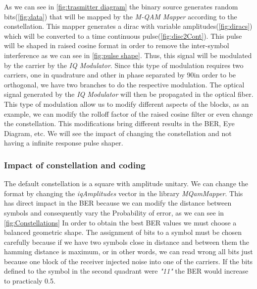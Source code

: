\begin{text}
As we can see in \ref{fig:trasmitter diagram} the binary source generates random bits(\ref{fig:data}) that will be mapped by the \textit{M-QAM Mapper} according to the constellation. This mapper generates a dirac with variable amplitudes(\ref{fig:diracs}) which will be converted to a time continuous pulse(\ref{fig:disc2Cont}).\newline
This pulse will be shaped in raised cosine format in order to remove the inter-symbol interference as we can see in \ref{fig:pulse shape}. Thus, this signal will be modulated by the carrier by the \textit{IQ Modulator}.\newline
Since this type of modulation requires two carriers, one in quadrature and other in phase separated by 90\textdegree  in order to be orthogonal, we have two branches to do the respective modulation.\newline
The optical signal generated by the \textit{IQ Modulator} will then be propagated in the optical fiber.
\bigbreak
This type of modulation allow us to modify different aspects of the blocks, as an example, we can modify the rolloff factor of the raised cosine filter or even change the constellation. This modifications bring different results in the BER, Eye Diagram, etc. We will see the impact of changing the constellation and not having a infinite response pulse shaper.%
\subsubsection{Impact of constellation and coding}
The default constellation is a square with amplitude unitary. We can change the format by changing the \textit{iqAmplitudes} vector in the library \textit{MQamMapper}. This has direct impact in the BER because we can modify the distance between symbols and consequently vary the Probability of error, as we can see in \ref{fig:Constellations}
In order to obtain the best BER values we must choose a balanced geometric shape.
\bigbreak
The assignment of bits to a symbol must be chosen carefully because if we have two symbols close in distance and between them the hamming distance is maximum, or in other words, we can read wrong all bits just because one block of the receiver injected noise into one of the carriers. If the bits defined to the symbol in the second quadrant were \textit{"11"} the BER would increase to practicaly 0.5.

\end{text}
